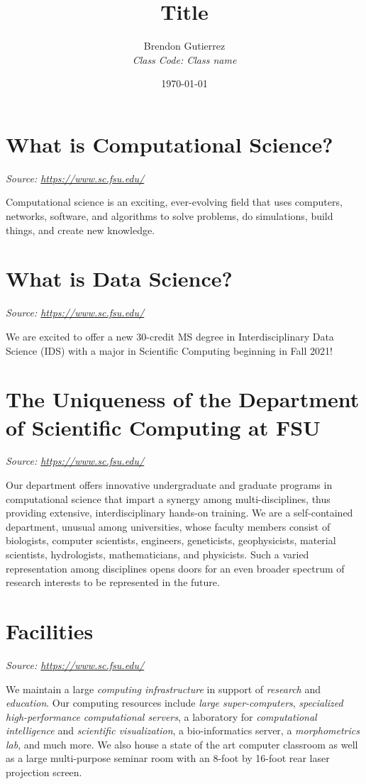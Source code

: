 \documentclass[12pt,a4paper]{article}
\title{Title}
\author{Brendon Gutierrez \\ \textit{Class Code: Class name}}
\date{\today}
\begin{document}
\maketitle

\onehalfspacing


\section{What is Computational Science?}
\textit{Source: \url{https://www.sc.fsu.edu/}}

Computational science is an exciting, ever-evolving field that uses computers, networks, software, and algorithms to solve problems, do simulations, build things, and create new knowledge.

\section{What is Data Science?}
\textit{Source: \url{https://www.sc.fsu.edu/}}

We are excited to offer a new 30-credit MS degree in Interdisciplinary Data Science (IDS) with a major in Scientific Computing beginning in Fall 2021!

\section{The Uniqueness of the Department of Scientific Computing at FSU}
\textit{Source: \url{https://www.sc.fsu.edu/}}

Our department offers innovative undergraduate and graduate programs in computational science that impart a synergy among multi-disciplines, thus providing extensive, interdisciplinary hands-on training. We are a self-contained department, unusual among universities, whose faculty members consist of biologists, computer scientists, engineers, geneticists, geophysicists, material scientists, hydrologists, mathematicians, and physicists. Such a varied representation among disciplines opens doors for an even broader spectrum of research interests to be represented in the future.

\section{Facilities}
\textit{Source: \url{https://www.sc.fsu.edu/}}

We maintain a large \textit{computing infrastructure} in support of \textit{research} and \textit{education}. Our computing resources include \textit{large super-computers}, \textit{specialized high-performance computational servers}, a laboratory for \textit{computational intelligence} and \textit{scientific visualization}, a bio-informatics server, a \textit{morphometrics lab}, and much more. We also house a state of the art computer classroom as well as a large multi-purpose seminar room with an 8-foot by 16-foot rear laser projection screen.
\end{document}
